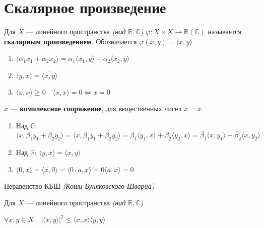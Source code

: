 




\section{Скалярное произведение}

\begin{definition}
    Для $X$ --- линейного пространства \textit{(над $\mathbb{R}, \mathbb{C}$)} $\varphi:X\times X \to \mathbb{R} (\mathbb{C})$ называется \textbf{скалярным произведением}. Обозначается $\varphi(x,y)=\langle x,y\rangle$
\end{definition}

\begin{enumerate}
    \item $\langle \alpha_1 x_1+\alpha_2 x_2 \rangle = \alpha_1\langle x_1,y\rangle+\alpha_2\langle x_2,y\rangle$\
    \item $\langle y,x\rangle = \overline{\langle x,y\rangle}$
    \item $\langle x,x\rangle \geq 0 \quad \langle x,x\rangle=0 \Leftrightarrow x=0$
\end{enumerate}

\begin{definition}
    $\overline{x}$ --- \textbf{комплексное сопряжение}, для вещественных чисел $\overline{x} = x$.    
\end{definition}

\begin{enumerate}
    \item Над $\mathbb{C}$: $\langle x,\beta_1 y_1 + \beta_2 y_2 \rangle = \overline{\langle x,\beta_1 y_1 + \beta_2 y_2 \rangle} = \overline{\beta_1\langle y_1, x\rangle + \beta_2 \langle y_2,x \rangle} = \overline{\beta_1} \langle x, y_1\rangle + \overline{\beta_2} \langle x,y_2\rangle$
    \item Над $\mathbb{R}$: $\langle y,x\rangle = \langle x,y\rangle$
    \item $\langle 0,x \rangle = \langle x,0 \rangle = \langle 0\cdot a,x \rangle = 0\langle a,x \rangle=0$
\end{enumerate}

\begin{lemma}
    Неравенство КБШ \textit{(Коши-Буняковского-Шварца)}
    
    Для $X$ --- линейного пространства \textit{(над $\mathbb{R}, \mathbb{C}$)}

    $\forall x,y\in X\quad |\langle x,y\rangle|^2\leq \langle x,x\rangle \langle y,y\rangle$
\end{lemma}


